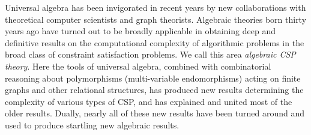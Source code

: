 Universal algebra has been invigorated in recent years by new collaborations
with theoretical computer scientists and graph theorists. Algebraic theories born thirty
years ago have turned out to be broadly applicable in obtaining deep and
definitive results on the computational complexity of algorithmic
problems in the broad class of constraint satisfaction problems.
We call this area \emph{algebraic \acs{CSP} theory}. Here the tools of universal
algebra, combined with combinatorial reasoning about polymorphisms
(multi-variable endomorphisms) acting on finite graphs and other relational
structures, has produced new results determining the complexity of various
types of \ac{CSP}, and has explained and united most of the older results. 
Dually, nearly all of these new results have been turned around and used to
produce startling new algebraic results.\\[4pt]
